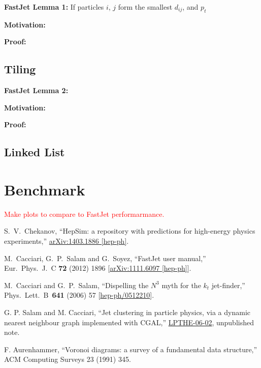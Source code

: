 \documentclass[12pt]{article}
\newcommand{\red}[1]{\textcolor{red}{#1}}
\begin{document}
{\vspace{7px} \bf FastJet Lemma 1:} If particles $i$, $j$ form the smallest $d_{ij}$, and $p_t$

{\vspace{7px} \bf Motivation:} 

{\vspace{7px} \bf Proof:} 

\subsection{Tiling}

{\vspace{7px} \bf FastJet Lemma 2:} 

{\vspace{7px} \bf Motivation:} 

{\vspace{7px} \bf Proof:} 

\subsection{Linked List}


\section{Benchmark}
\red{Make plots to compare to FastJet performarmance.}

\begin{thebibliography}{9}
  
  S.~V.~Chekanov,
  ``HepSim: a repository with predictions for high-energy physics experiments,''
  \href{http://arxiv.org/abs/1403.1886}{arXiv:1403.1886 [hep-ph]}.

  M.~Cacciari, G.~P.~Salam and G.~Soyez,
  ``FastJet user manual,''
  Eur.\ Phys.\ J.\ C {\bf 72} (2012) 1896
  [\href{http://arxiv.org/abs/1111.6097}{arXiv:1111.6097 [hep-ph]}].

  M.~Cacciari and G.~P.~Salam,
  ``Dispelling the $N^{3}$ myth for the $k_t$ jet-finder,''
  Phys.\ Lett.\ B\ {\bf 641} (2006) 57
  [\href{http://arxiv.org/abs/hep-ph/0512210}{hep-ph/0512210}].

  G. P. Salam and M. Cacciari,
  ``Jet clustering in particle physics, via a dynamic nearest neighbour graph implemented with CGAL,''
  \href{http://www.lpthe.jussieu.fr/~salam/repository/docs/kt-cgta-v2.pdf}{LPTHE-06-02},
  unpublished note.
  
  F. Aurenhammer,
  ``Voronoi diagrams: a survey of a fundamental data structure,''
  ACM Computing Surveys 23 (1991) 345.

\end{thebibliography}
\end{document}
